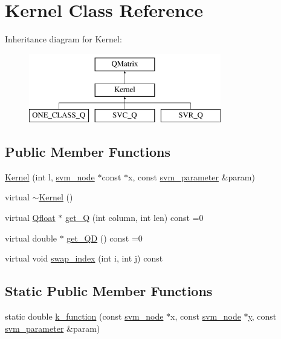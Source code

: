 \hypertarget{classKernel}{}\section{Kernel Class Reference}
\label{classKernel}
Inheritance diagram for Kernel\+:\begin{figure}[H]
\begin{center}
\leavevmode
\includegraphics[height=3.000000cm]{classKernel}
\end{center}
\end{figure}
\subsection*{Public Member Functions}
\begin{DoxyCompactItemize}
\item 
\hyperlink{classKernel_a25ffaa0c67cc5b8c7fcdb6f97ca1725f}{Kernel} (int l, \hyperlink{structsvm__node}{svm\+\_\+node} $\ast$const $\ast$x, const \hyperlink{structsvm__parameter}{svm\+\_\+parameter} \&param)
\item 
virtual \hyperlink{classKernel_a9c7407e3a0b1cb9b2f96e9a030187064}{$\sim$\+Kernel} ()
\item 
virtual \hyperlink{svm__core_8cpp_a8755d90a54ecfb8d15051af3e0542592}{Qfloat} $\ast$ \hyperlink{classKernel_a02f328649424359b92b941f5219a6060}{get\+\_\+Q} (int column, int len) const  =0
\item 
virtual double $\ast$ \hyperlink{classKernel_a7bf9602583da1af48d15d19da69514ac}{get\+\_\+\+QD} () const  =0
\item 
virtual void \hyperlink{classKernel_adca807c5584bc42fd098cd9eb1f19621}{swap\+\_\+index} (int i, int j) const 
\end{DoxyCompactItemize}
\subsection*{Static Public Member Functions}
\begin{DoxyCompactItemize}
\item 
static double \hyperlink{classKernel_a6ff0d4ac64bf7fba29d2ca3433dd5127}{k\+\_\+function} (const \hyperlink{structsvm__node}{svm\+\_\+node} $\ast$x, const \hyperlink{structsvm__node}{svm\+\_\+node} $\ast$\hyperlink{untested_2pldi08_8c_a0a2f84ed7838f07779ae24c5a9086d33}{y}, const \hyperlink{structsvm__parameter}{svm\+\_\+parameter} \&param)
\end{DoxyCompactItemize}
